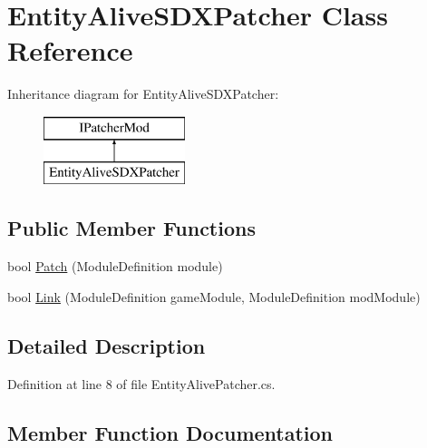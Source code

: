 \hypertarget{class_entity_alive_s_d_x_patcher}{}\section{Entity\+Alive\+S\+D\+X\+Patcher Class Reference}
\label{class_entity_alive_s_d_x_patcher}
Inheritance diagram for Entity\+Alive\+S\+D\+X\+Patcher\+:\begin{figure}[H]
\begin{center}
\leavevmode
\includegraphics[height=2.000000cm]{dc/d8b/class_entity_alive_s_d_x_patcher}
\end{center}
\end{figure}
\subsection*{Public Member Functions}
\begin{DoxyCompactItemize}
\item 
bool \mbox{\hyperlink{class_entity_alive_s_d_x_patcher_ad788ad16448a2a09ac7e0f4cd7c6030e}{Patch}} (Module\+Definition module)
\item 
bool \mbox{\hyperlink{class_entity_alive_s_d_x_patcher_a07ae5aad8d3a741523d269514d1586cc}{Link}} (Module\+Definition game\+Module, Module\+Definition mod\+Module)
\end{DoxyCompactItemize}


\subsection{Detailed Description}


Definition at line 8 of file Entity\+Alive\+Patcher.\+cs.



\subsection{Member Function Documentation}
\mbox{\label{class_entity_alive_s_d_x_patcher_a07ae5aad8d3a741523d269514d1586cc}} 
